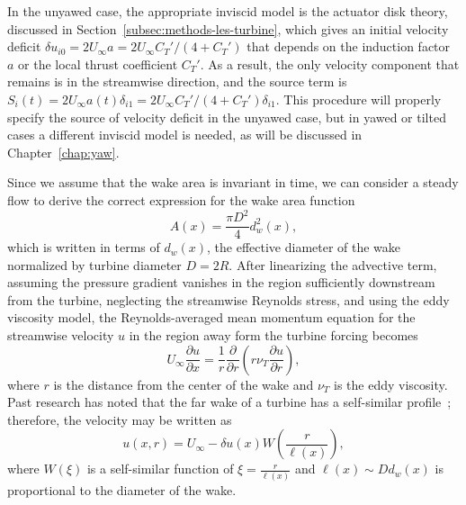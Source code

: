 In the unyawed case, the appropriate inviscid model is the actuator disk theory, discussed in Section~\ref{subsec:methods-les-turbine}, which gives an initial velocity deficit $\delta u_{i0} = 2 U_\infty a = 2 U_\infty C_T'/(4+C_T')$ that depends on the induction factor $a$ or the local thrust coefficient $C_T'$. As a result, the only velocity component that remains is in the streamwise direction, and the source term is $S_i(t) = 2 U_\infty a(t) \delta_{i1} = 2 U_\infty C_T'/(4+C_T') \delta_{i1}$. This procedure will properly specify the source of velocity deficit in the unyawed case, but in yawed or tilted cases a different inviscid model is needed, as will be discussed in Chapter~\ref{chap:yaw}.

Since we assume that the wake area is invariant in time, we can consider a steady flow to derive the correct expression for the wake area function
\begin{equation}
A(x)= \frac{\pi D^2}{4} d_w^2(x),
\end{equation}
which is written in terms of $d_w(x)$, the effective diameter of the wake normalized by turbine diameter $D=2R$. After linearizing the advective term, assuming the pressure gradient vanishes in the region sufficiently downstream from the turbine, neglecting the streamwise Reynolds stress, and using the eddy viscosity model, the Reynolds-averaged mean momentum equation for the streamwise velocity $u$ in the region away form the turbine forcing becomes
\begin{equation}
\label{eq:RANS_eddy_viscosity}
U_\infty \frac{\partial u}{\partial x} = \frac{1}{r} \frac{\partial}{\partial r} \left( r \nu_T  \frac{\partial u}{\partial r} \right),
\end{equation}
where $r$ is the distance from the center of the wake and $\nu_T$ is the eddy viscosity. Past research has noted that the far wake of a turbine has a self-similar profile~\cite{Bastankhah2014a}; therefore, the velocity may be written as
\begin{equation}
\label{eq:deficit_profile}
u(x,r) = U_\infty - \delta u(x) W\left(\frac{r}{\ell(x)}\right),
\end{equation}
where $W(\xi)$ is a self-similar function of $\xi = \frac{r}{\ell(x)}$ and $\ell(x) \sim D d_w(x)$ is proportional to the diameter of the wake. 

